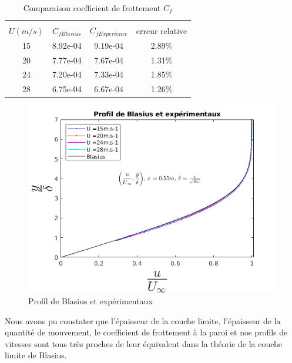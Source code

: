 \begin{table}[ht]
	\centering
	\begin{tabular}{cccc}
		\hline\\
		$U(m/s)$ & $C_{fBlasius}$ &
		$ C_{fExperience}$ & 
		 erreur relative\\
		\hline
   15 & 8.92e-04   & 9.19e-04   & 2.89\%\\
   20 & 7.77e-04   & 7.67e-04   & 1.31\%\\
   24 & 7.20e-04   & 7.33e-04   & 1.85\%\\
   28 & 6.75e-04   & 6.67e-04   & 1.26\%
	\end{tabular}
	\caption{Comparaison coefficient de frottement $C_{f}$}
\end{table}
\begin{figure}[ht]
	\centering
	\includegraphics[scale = 0.6]{./image/Bla.png}
	\caption{Profil de Blasius et expérimentaux}
\end{figure}
\newpage
Nous avons pu constater que l'épaisseur de la couche limite, l'épaisseur de la quantité de mouvement, le coefficient de frottement à la paroi et nos profils de vitesses sont tous très proches de leur équivalent dans la théorie de la couche limite de Blasius.
